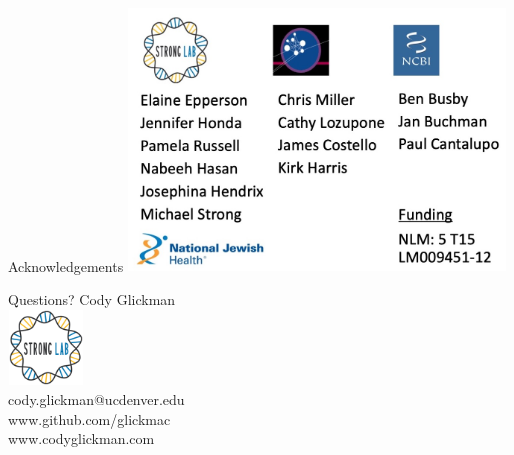 \documentclass[11pt, xcolor=table]{beamer}
\begin{document}
	
	\begin{frame}{Acknowledgements}
	\center
	\includegraphics[height=7cm, width=10cm]{CPBS_11_18/Acknowledgements.jpg}
	\end{frame}
	
	\begin{frame}{Questions?}
	\center
	Cody Glickman \\ \includegraphics[height=2cm, width=2cm]{lablogo.png} \\ cody.glickman@ucdenver.edu \\ \alert{www.github.com/glickmac} \\ www.codyglickman.com
	\end{frame}

	
	
\end{document}
